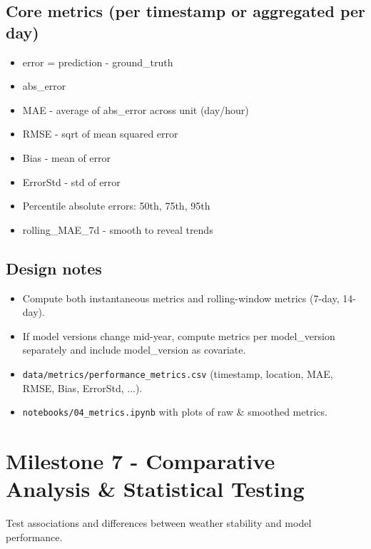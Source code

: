 \documentclass[11pt,a4paper]{article}
\begin{document}
\subsection{Core metrics (per timestamp or aggregated per day)}
\begin{itemize}
    \item error = prediction - ground\_truth
    \item abs\_error
    \item MAE - average of abs\_error across unit (day/hour)
    \item RMSE - sqrt of mean squared error
    \item Bias - mean of error
    \item ErrorStd - std of error
    \item Percentile absolute errors: 50th, 75th, 95th
    \item rolling\_MAE\_7d - smooth to reveal trends
\end{itemize}

\subsection{Design notes}
\begin{itemize}
    \item Compute both instantaneous metrics and rolling-window metrics (7-day, 14-day).
    \item If model versions change mid-year, compute metrics per model\_version separately and include model\_version as covariate.
\end{itemize}

\begin{deliverablebox}
\begin{itemize}
    \item \texttt{data/metrics/performance\_metrics.csv} (timestamp, location, MAE, RMSE, Bias, ErrorStd, ...).
    \item \texttt{notebooks/04\_metrics.ipynb} with plots of raw \& smoothed metrics.
\end{itemize}
\end{deliverablebox}

\section{Milestone 7 - Comparative Analysis \& Statistical Testing}

\begin{objectivebox}
Test associations and differences between weather stability and model performance.
\end{objectivebox}
\end{document}
